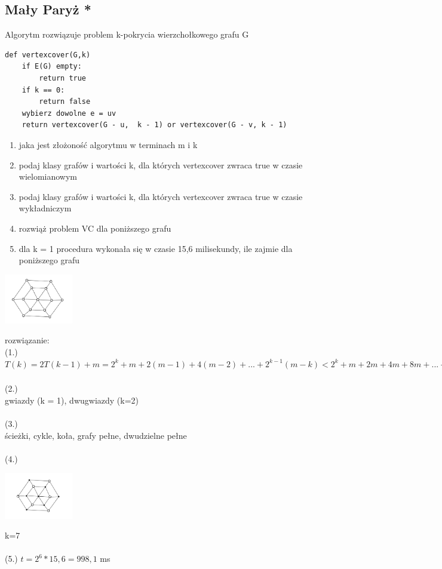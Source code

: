 \documentclass{article}
\begin{document}
\subsection*{Mały Paryż *}
Algorytm rozwiązuje problem k-pokrycia wierzchołkowego grafu G
\begin{lstlisting}
def vertexcover(G,k)
	if E(G) empty: 
		return true
	if k == 0:
		return false
	wybierz dowolne e = uv
	return vertexcover(G - u,  k - 1) or vertexcover(G - v, k - 1)
\end{lstlisting}
\begin{enumerate}
	\item jaka jest złożoność algorytmu w terminach m i k
	\item podaj klasy grafów i wartości k, dla których vertexcover zwraca true w czasie wielomianowym
	\item podaj klasy grafów i wartości k, dla których vertexcover zwraca true w czasie wykładniczym
	\item rozwiąż problem VC dla poniższego grafu
	\item dla k = 1 procedura wykonała się w czasie 15,6 milisekundy, ile zajmie dla poniższego grafu
\end{enumerate}
\begin{center}
\includegraphics[width=3cm]{paryz}
\end{center}
rozwiązanie: \\
(1.)\\
$T(k) = 2T(k-1) + m = 2^{k} + m + 2(m-1) + 4(m-2) + ... + 2^{k-1} (m - k) < 2^{k} + m + 2m + 4m + 8m + ... + 2^{k-1}m = O(m2^k)$ \\\\
(2.)\\
gwiazdy (k = 1),  dwugwiazdy (k=2) \\\\
(3.)\\
ścieżki, cykle, koła, grafy pełne, dwudzielne pełne \\\\
(4.) \\
\begin{center}
\includegraphics[width=3cm]{paryz_rozw}
\end{center}
k=7 \\\\
(5.)
$t = 2^6 * 15,6 = 998,1$ ms  
\end{document}
